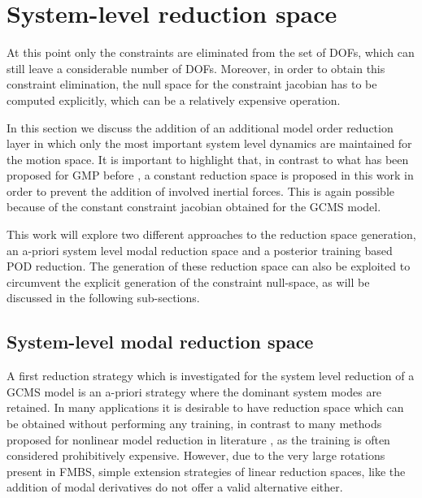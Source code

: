 
\section{{System-level reduction space}} 
\label{sec-reduction_space}


At this point only the constraints are eliminated from the set of DOFs, which can still leave a considerable number of DOFs. Moreover, in order to obtain this constraint elimination, the null space for the constraint jacobian has to be computed explicitly, which can be a relatively expensive operation. 

In this section we discuss the addition of an additional model order reduction layer in which only the most important system level dynamics are maintained for the motion space. It is important to highlight that, in contrast to what has been proposed for GMP before \cite{Bruls_IJNME2008, NaetsHeirman2011}, a constant reduction space is proposed in this work in order to prevent the addition of involved inertial forces. This is again possible because of the constant constraint jacobian obtained for the GCMS model. 
  
This work will explore two different approaches to the reduction space generation, an a-priori system level modal reduction space and a posterior training based POD reduction. The generation of these reduction space can also be exploited to circumvent the explicit generation of the constraint null-space, as will be discussed in the following sub-sections. 

\subsection{System-level modal reduction space}
\label{sec:sl_modal}
A first reduction strategy which is investigated for the system level reduction of a GCMS model is an a-priori strategy where the dominant system modes are retained. In many applications it is desirable to have reduction space which can be obtained without performing any training, in contrast to many methods proposed for nonlinear model reduction in literature \cite{DEIM,ECSW}, as the training is often considered prohibitively expensive. However, due to the very large rotations present in FMBS, simple extension strategies of linear reduction spaces, like the addition of modal derivatives \cite{Idelsohn1985,RutzmoserTiso?} do not offer a valid alternative either. 

